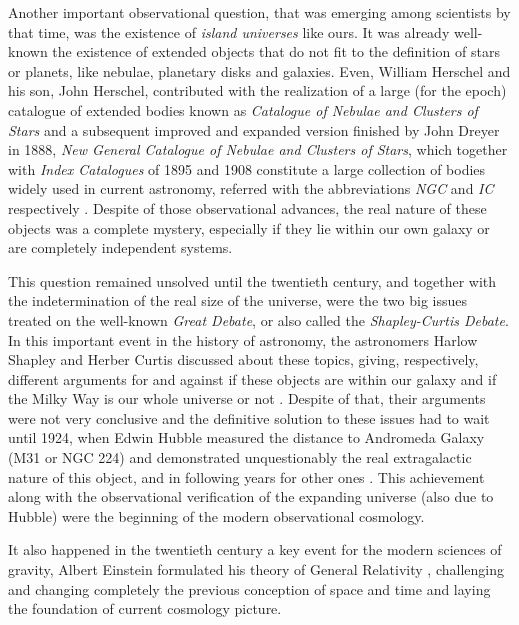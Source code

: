 Another important observational question, that was emerging among 
scientists by that time, was the existence of \textit{island universes} 
like ours. It was already well-known the existence of extended objects 
that do not fit to the definition of stars or planets, like nebulae, 
planetary disks and galaxies. Even, William Herschel and his son, John 
Herschel, contributed with the realization of a large (for the epoch) 
catalogue of extended bodies known as \textit{Catalogue of Nebulae and 
Clusters of Stars} and a subsequent improved and expanded version finished 
by John Dreyer in 1888, \textit{New General Catalogue of Nebulae and 
Clusters of Stars}, which together with \textit{Index Catalogues} of 1895 
and 1908 constitute a large collection of bodies widely used in current 
astronomy, referred with the abbreviations \textit{NGC} and \textit{IC} 
respectively \cite{longair2008}. Despite of those observational advances, 
the real nature of these objects was a complete mystery, especially if they 
lie within our own galaxy or are completely independent systems. 


This question remained unsolved until the twentieth century, and together 
with the indetermination of the real size of the universe, were the two 
big issues treated on the well-known \textit{Great Debate}, or also called 
the \textit{Shapley-Curtis Debate}. In this important event in the history 
of astronomy, the astronomers Harlow Shapley and Herber Curtis discussed 
about these topics, giving, respectively, different arguments for and 
against if these objects are within our galaxy and if the Milky Way is our 
whole universe or not \cite{Curtis1921} \cite{Shapley1921}. Despite of 
that, their arguments were not very conclusive and the definitive solution 
to these issues had to wait until 1924, when Edwin Hubble measured the 
distance to Andromeda Galaxy (M31 or NGC 224) and demonstrated 
unquestionably the real extragalactic nature of this object, and in 
following years for other ones \cite{Hubble1926}. This achievement along 
with the observational verification of the expanding universe (also due to 
Hubble) were the beginning of the modern observational cosmology.


It also happened in the twentieth century a key event for the modern 
sciences of gravity, Albert Einstein formulated his theory of General 
Relativity \cite{Einstein1916}, challenging and changing completely the 
previous conception of space and time and laying the foundation of current 
cosmology picture.



